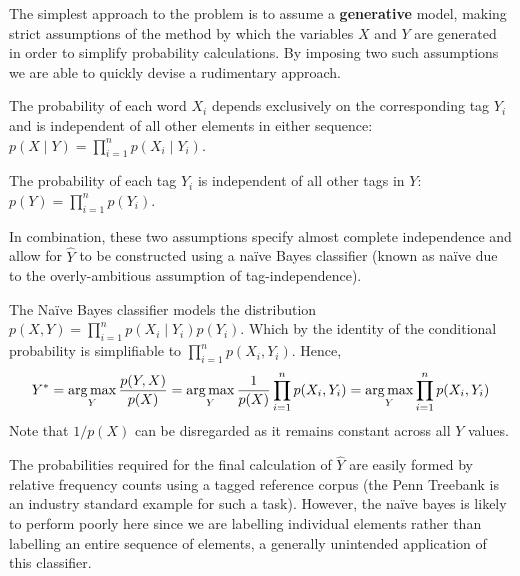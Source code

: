 \documentclass[../main.tex]{subfiles}
\begin{document}
The simplest approach to the problem is to assume a \textbf{generative} model, making strict assumptions of the method by which the variables $X$ and $Y$ are generated in order to simplify probability calculations.
By imposing two such assumptions we are able to quickly devise a rudimentary approach.

\begin{assumption}
The probability of each word $X_i$ depends exclusively on the corresponding tag $Y_i$ and is independent of all other elements in either sequence: $p (X \mid Y) = \prod_{i=1}^n p (X_i \mid Y_i)$.
\end{assumption}

\begin{assumption}
The probability of each tag $Y_i$ is independent of all other tags in $Y$: $p (Y) = \prod_{i=1}^n p (Y_i)$.
\end{assumption}

In combination, these two assumptions specify almost complete independence and allow for $\hat{Y}$ to be constructed using a na{\"i}ve Bayes classifier (known as na{\"i}ve due to the overly-ambitious assumption of tag-independence).

The Na{\"i}ve Bayes classifier models the distribution $p(X,Y) = \prod_{i=1}^n p(X_i \mid Y_i)p(Y_i)$. Which by the identity of the conditional probability is simplifiable to $\prod_{i=1}^n p(X_i, Y_i)$. Hence,
\begin{equation*}
    Y^* = \operatorname*{arg\,max}_Y \frac{p(Y,X)}{p(X)} = \operatorname*{arg\,max}_Y \frac{1}{p(X)}\prod_{i=1}^n p(X_i, Y_i) = \operatorname*{arg\,max}_Y \prod_{i=1}^n p(X_i, Y_i)
\end{equation*}
Note that $1/p(X)$ can be disregarded as it remains constant across all $Y$ values.

The probabilities required for the final calculation of $\hat{Y}$ are easily formed by relative frequency counts using a tagged reference corpus (the Penn Treebank is an industry standard example for such a task).
However, the na{\"i}ve bayes is likely to perform poorly here since we are labelling individual elements rather than labelling an entire sequence of elements, a generally unintended application of this classifier.
\end{document}
